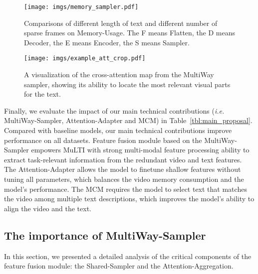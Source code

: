 \documentclass[10pt,twocolumn,letterpaper]{article}
\begin{document}
\begin{figure}[!t]
\centering
\texttt{[image: imgs/memory\_sampler.pdf]}
\vspace{-1ex}
\caption{
Comparisons of different length of text and different number of sparse frames on Memory-Usage. The F means Flatten, the D means Decoder, the E means Encoder, the S means Sampler.
}
\label{fig:memory_sampler}
\vspace{-2ex}
\end{figure} \begin{figure}[!t]
\centering
\texttt{[image: imgs/example\_att\_crop.pdf]}
\caption{
A visualization of the cross-attention map from the MultiWay sampler, showing its ability to locate the most relevant visual parts for the text.
}
\label{fig:example_att}
\vspace{-3ex}
\end{figure} Finally, we evaluate the impact of our main technical contributions (\textit{i.e.} MultiWay-Sampler, Attention-Adapter and MCM) in Table~\ref{tbl:main_proposal}.
Compared with baseline models, our main technical contributions improve performance on all datasets. 
Feature fusion module based on the MultiWay-Sampler empowers MuLTI with strong multi-modal feature processing ability to extract task-relevant information from the redundant video and text features.
The Attention-Adapter allows the model to finetune shallow features without tuning all parameters, which balances the video memory consumption and the model's performance.
The MCM requires the model to select text that matches the video among multiple text descriptions, which improves the model’s ability to align the video and the text.

\vspace{-1.5ex}
\subsection{The importance of MultiWay-Sampler}\label{sec:exp-exclusive}
\vspace{-1ex}
In this section, we presented a detailed analysis of the critical components of the feature fusion module: the Shared-Sampler and the Attention-Aggregation.
\end{document}
